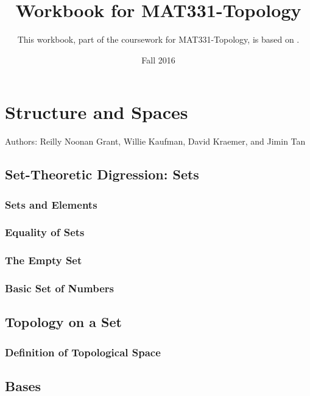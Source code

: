 \documentclass{book}
\title{Workbook for MAT331-Topology}
\date{Fall 2016}
\author{This workbook, part of the coursework for MAT331-Topology, is based on \cite{viro}.}
\begin{document}


\chapter{Structure and Spaces}
Authors: Reilly Noonan Grant, Willie Kaufman, David Kraemer, and Jimin Tan

\section{Set-Theoretic Digression: Sets}
\subsection{Sets and Elements}%
\subsection{Equality of Sets}%
\subsection{The Empty Set}%
\subsection{Basic Set of Numbers}%










\section{Topology on a Set}

\subsection{Definition of Topological Space}















\section{Bases}






\end{document}
